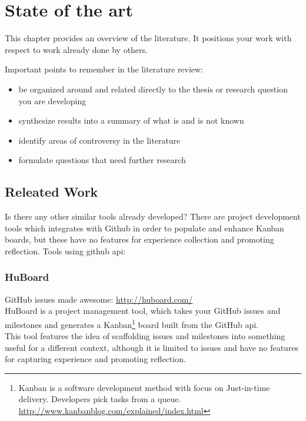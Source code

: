 \chapter{State of the art}

This chapter provides an overview of the literature. It positions your work with respect to
work already done by others.

Important points to remember in the literature review:
\begin{itemize}
\item be organized around and related directly to the thesis or research question you are developing
\item synthesize results into a summary of what is and is not known
\item identify areas of controversy in the literature
\item formulate questions that need further research
\end{itemize}

\section{Releated Work}
Is there any other similar tools already developed? There are project development tools which integrates with Github in order to populate and enhance Kanban boards, but these have no features for experience collection and promoting reflection. 
Tools using github api: \\
\subsection*{HuBoard}
GitHub issues made awesome: \url{http://huboard.com/} \\
HuBoard is a project management tool, which takes your GitHub issues and milestones and generates a Kanban\footnote{Kanban is a software development method with focus on Just-in-time delivery. Developers pick tasks from a queue. \url{http://www.kanbanblog.com/explained/index.html}} board built from the GitHub api. \\
This tool features the idea of scaffolding issues and milestones into something useful for a different context, although it is limited to issues and have no features for capturing experience and promoting reflection. 
